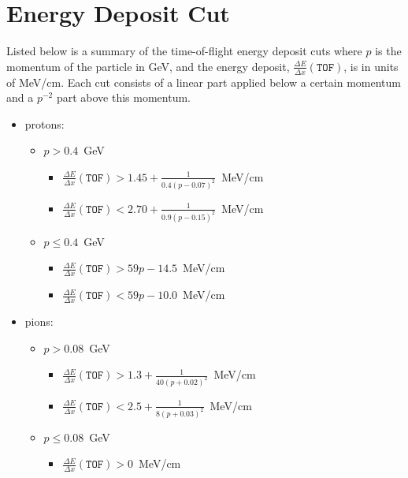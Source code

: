 \chapter{\label{sec:app.tofe} Energy Deposit Cut}

Listed below is a summary of the time-of-flight energy deposit cuts where $p$ is the momentum of the particle in GeV, and the energy deposit, $\frac{\Delta E}{\Delta x}(\mathtt{TOF})$, is in units of MeV/cm. Each cut consists of a linear part applied below a certain momentum and a $p^{-2}$ part above this momentum.

\begin{itemize}
    \item[] protons:
    \begin{itemize}
        \item[] $p > 0.4$~GeV
        \begin{itemize}
            \item[] $\frac{\Delta E}{\Delta x}(\mathtt{TOF}) > 1.45 + \frac{1}{0.4 (p - 0.07)^2}$~MeV/cm
            \item[] $\frac{\Delta E}{\Delta x}(\mathtt{TOF}) < 2.70 + \frac{1}{0.9 (p - 0.15)^2}$~MeV/cm
        \end{itemize}
        \item[] $p \leq 0.4$~GeV
        \begin{itemize}
            \item[] $\frac{\Delta E}{\Delta x}(\mathtt{TOF}) > 59 p - 14.5$~MeV/cm
            \item[] $\frac{\Delta E}{\Delta x}(\mathtt{TOF}) < 59 p - 10.0$~MeV/cm
        \end{itemize}
    \end{itemize}
    \item[] pions:
    \begin{itemize}
        \item[] $p > 0.08$~GeV
        \begin{itemize}
            \item[] $\frac{\Delta E}{\Delta x}(\mathtt{TOF}) > 1.3 + \frac{1}{40 (p + 0.02)^2}$~MeV/cm
            \item[] $\frac{\Delta E}{\Delta x}(\mathtt{TOF}) < 2.5 + \frac{1}{ 8 (p + 0.03)^2}$~MeV/cm
        \end{itemize}
        \item[] $p \leq 0.08$~GeV
        \begin{itemize}
            \item[] $\frac{\Delta E}{\Delta x}(\mathtt{TOF}) > 0$~MeV/cm

\end{itemize}
\end{itemize}
\end{itemize}
